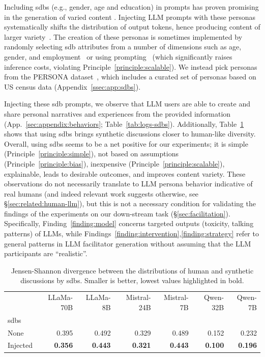 Including \acfp{sdb} (e.g., gender, age and education) in prompts has proven promising in the generation of varied content \cite{burton2024large,sommerauer-etal-2025-simulating}. Injecting LLM prompts with these personas systematically shifts the distribution of output tokens, hence producing content of larger variety~\cite{liu_2024_bias}. The creation of these personas is sometimes implemented by randomly selecting \ac{sdb} attributes from a number of dimensions such as age, gender, and employment~\cite{adornetto2025_gabms} or using prompting~\cite{park_simulacra} (which significantly raises inference costs, violating Principle~\ref{principle:scalable}). We instead pick personas from the PERSONA dataset~\cite{castricato-etal-2025-persona}, which includes a curated set of personas based on US census data (Appendix~\ref{ssec:app:sdbs}). 

Injecting these \ac{sdb} prompts, we observe that LLM users are able to create and share personal narratives and experiences from the provided information (App.~\ref{sec:appendix:behaviors}; Table~\ref{tab:logs-sdbs}). Additionally, Table~\ref{tab:divergence-sdbs} shows that using \acp{sdb} brings synthetic discussions closer to human-like diversity. Overall, using \acp{sdb} seems to be a net positive for our experiments; it is simple (Principle~\ref{principle:simple}), not based on assumptions (Principle~\ref{principle:bias}), inexpensive (Principle~\ref{principle:scalable}), explainable, leads to desirable outcomes, and improves content variety. These observations do not necessarily translate to LLM persona behavior indicative of real humans (and indeed relevant work suggests otherwise, see \S\ref{sec:related:human-llm}), but this is not a necessary condition for validating the findings of the experiments on our down-stream task (\S\ref{sec:facilitation}). Specifically, Finding~\ref{finding:model} concerns targeted outputs (toxicity, talking patterns) of LLMs, while Findings~\ref{finding:intervention},\ref{finding:strategy} refer to general patterns in LLM facilitator generation without assuming that the LLM participants are ``realistic''.


\begin{table}[ht]
	\caption{Jensen-Shannon divergence between the \diversity distributions  of human and synthetic discussions by \acp{sdb}. Smaller is better, lowest values highlighted in bold.}
	\label{tab:divergence-sdbs}
	\begin{tabular}{lrrrrrr}
		\toprule
		& LLaMa-70B & LLaMa-8B & Mistral-24B & Mistral-7B & Qwen-32B & Qwen-7B \\
		\acp{sdb} &  &  &  &  &  &  \\
		\midrule
		None & 0.395 & 0.492 & 0.329 & 0.489 & 0.152 & 0.232 \\
		Injected & \textbf{0.356} & \textbf{0.443} & \textbf{0.321} & \textbf{0.443} & \textbf{0.100} & \textbf{0.196} \\
		\bottomrule
	\end{tabular}
\end{table}



